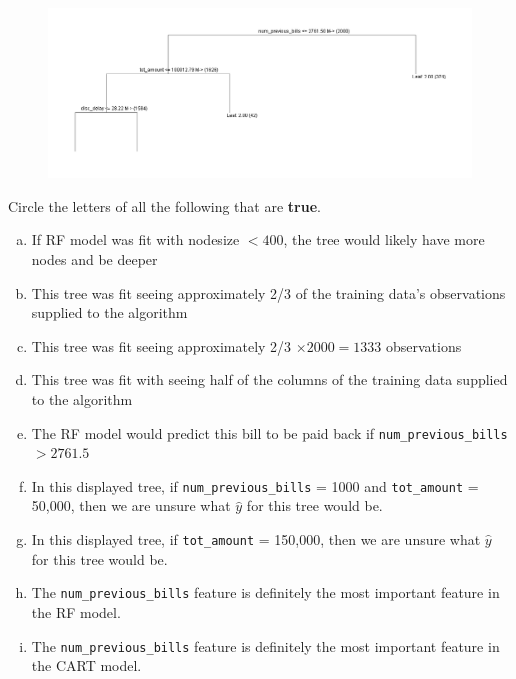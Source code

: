 \documentclass[12pt]{article}
\begin{document}
\vspace{-0.5cm}
\begin{figure}[htp]
\centering
\includegraphics[width=7in]{tree.png}
\end{figure}
\vspace{-0.5cm}



 Circle the letters of all the following that are \textbf{true}.



\begin{enumerate}[(a)]
\item If RF model was fit with nodesize $< 400$, the tree would likely have more nodes and be deeper
\item This tree was fit seeing approximately 2/3 of the training data's observations supplied to the algorithm
\item This tree was fit seeing approximately 2/3 $\times 2000 = 1333$ observations
\item This tree was fit with seeing half of the columns of the training data supplied to the algorithm
\item The RF model would predict this bill to be paid back if \texttt{num\_previous\_bills} $> 2761.5$ 
\item In this displayed tree, if \texttt{num\_previous\_bills} = 1000 and \texttt{tot\_amount} = 50,000, then we are unsure what $\hat{y}$ for this tree would be.
\item In this displayed tree, if \texttt{tot\_amount} = 150,000, then we are unsure what $\hat{y}$ for this tree would be.
\item The \texttt{num\_previous\_bills} feature is definitely the most important feature in the RF model.
\item The \texttt{num\_previous\_bills} feature is definitely the most important feature in the CART model.
\end{enumerate}

\eenum
\end{document}
